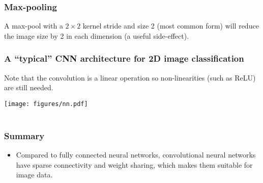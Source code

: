 \documentclass[notes]{beamer}          %
\begin{document}
\begin{frame}
\frametitle{Max-pooling}
\begin{center}
\end{center}
A max-pool with a $2\times2$ kernel stride and size 2 (most common form) will reduce the image size by 2 in each dimension (a useful side-effect).
\end{frame}

\begin{frame}
\frametitle{A ``typical'' CNN architecture for 2D image classification}
Note that the convolution is a linear operation so non-linearities (such as ReLU) are still needed.
\begin{center}
\begin{center}
\texttt{[image: figures/nn.pdf]} \\~\
\end{center}
\end{center}
\end{frame}

\begin{comment}

\begin{frame}
\frametitle{Training CNNs}
\begin{center}
\texttt{[image: figures/mnist\_example.png]} \\~\
\href{https://cs.stanford.edu/people/karpathy/convnetjs/demo/mnist.html}{Example} by Andrej Karpathy.
\end{center}
\end{frame}

\end{comment}


\begin{frame}
\frametitle{Summary}
\begin{itemize}
    \item Compared to fully connected neural networks, convolutional neural networks have sparse connectivity and weight sharing, which makes them suitable for image data.
\end{itemize}
\end{frame}
\end{document}
